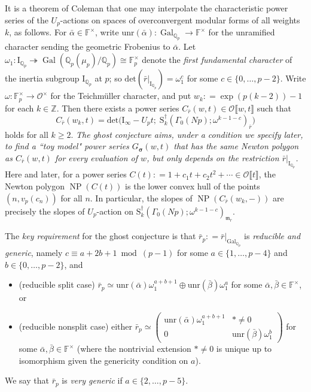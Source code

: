 \documentclass[12pt]{amsart}
\theoremstyle{definition}
\numberwithin{equation}{subsection}
\def\calO{\mathcal{O}}
\def\gothm{\mathfrak{m}}
\def\FF{\mathbb{F}}
\def\QQ{\mathbb{Q}}
\def\ZZ{\mathbb{Z}}
\def\rmI{\mathrm{I}}
\def\rmS{\mathrm{S}}
\DeclareMathOperator{\Gal}{Gal}
\DeclareMathOperator{\NP}{NP}
\newcommand{\bbsigma}{\boldsymbol{\sigma}}
\renewcommand{\det}{\mathrm{det}}
\newcommand{\unr}{\mathrm{unr}}
\newcommand{\MATRIX}[4]{{\begin{pmatrix}#1&#2\\#3& #4\end{pmatrix}}}
\begin{document}
It is a theorem of Coleman that one may interpolate the characteristic power series of the $U_p$-actions on spaces of overconvergent modular forms of all weights $k$, as follows. For $\bar \alpha \in \FF^\times$, write $\unr(\bar \alpha): \Gal_{\QQ_p} \to \FF^\times$ for the unramified character sending the geometric Frobenius to $\bar\alpha$.
Let
$\omega_1: \rmI_{\QQ_p} \twoheadrightarrow \Gal(\QQ_p(\mu_p)/\QQ_p) \cong \FF_p^\times$ denote the \emph{first fundamental character} of the inertia subgroup $\rmI_{\QQ_p}$ at $p$; so
$\det ( \bar r|_{\rmI_{\QQ_p}})=\omega_1^c$ for some $c \in \{0, \dots, p-2\}$. 
Write $\omega: \FF_p^\times \to \calO^\times$ for the Teichm\"uller character, and  put $w_k : = \exp(p(k-2))-1$ for each $k \in \ZZ$. 
Then there exists a power series $C_{\bar r}(w,t) \in \calO\llbracket w,t\rrbracket$ such that
$$
C_{\bar r}(w_k, t) = \det \big( \rmI_\infty - U_p t; \; \rmS^\dagger_k(\Gamma_0(Np); \omega^{k-1-c})_{\bar r}\big)
$$
holds for all $k\geq 2$.
\emph{The ghost conjecture aims, under a condition we specify later, to find a ``toy model" power series $G_{\bbsigma}(w,t)$ that has the same Newton polygon as $C_{\bar r}(w,t)$ for every evaluation of $w$, but only depends on the restriction $
\bar r|_{\rmI_{\QQ_p}}$.} Here and later, for a power series $C(t): = 1+ c_1t+c_2t^2+\cdots \in \calO\llbracket t\rrbracket$, the Newton polygon $\NP(C(t))$ is the lower convex hull of the points $(n, v_p(c_n))$ for all $n$. In particular, the slopes of $\NP(C_{\bar r}(w_k,-))$ are precisely the slopes of $U_p$-action on $\rmS^\dagger_k(\Gamma_0(Np);\omega^{k-1-c})_{\gothm_{\bar r}}$.

The \emph{key requirement} for the ghost conjecture is that $\bar r_p: = \bar r|_{\Gal_{\QQ_p}}$ is \emph{reducible and generic}, namely $c \equiv a+2b+1 \bmod (p-1)$ for some $a \in \{1, \dots, p-4\}$ and $b \in \{0, \dots, p-2\}$, and
\begin{itemize}
\item (reducible split case) $\bar r_p \simeq  \unr(\bar \alpha) \omega_1^{a+b+1} \oplus \unr(\bar \beta) \omega_1^a$ for some $\bar\alpha, \bar\beta \in \FF^\times$, or
\item (reducible nonsplit case) either $\bar r_p \simeq \MATRIX{\unr(\bar\alpha)\omega_1^{a+b+1}}{*\neq 0}{0}{\unr(\bar \beta)\omega_1^b}$ for some $\bar \alpha, \bar\beta \in \FF^\times$ (where the nontrivial extension $* \neq 0$ is unique up to isomorphism given the genericity condition on $a$).
\end{itemize}
We say that $\bar r_p$ is \emph{very generic} if $a \in \{2, \dots, p-5\}$.
\end{document}
